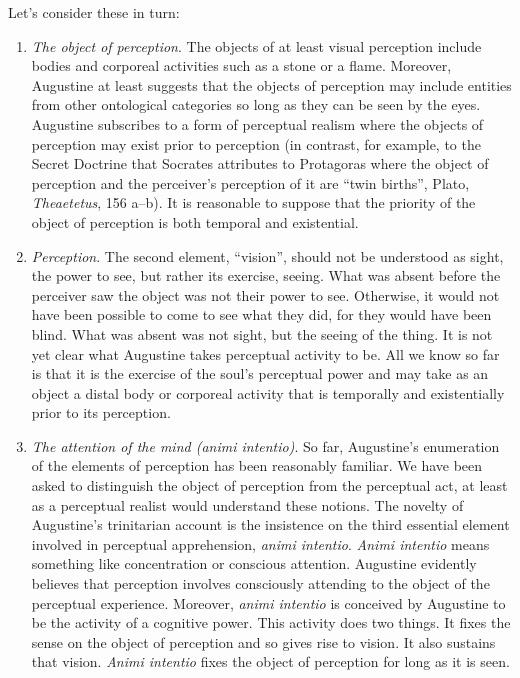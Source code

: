 \documentclass[12pt]{article}
\begin{document}
Let's consider these in turn:
\begin{enumerate}[(1)]
	\item \emph{The object of perception}. The objects of at least visual perception include bodies and corporeal activities such as a stone or a flame. Moreover, Augustine at least suggests that the objects of perception may include entities from other ontological categories so long as they can be seen by the eyes. Augustine subscribes to a form of perceptual realism where the objects of perception may exist prior to perception (in contrast, for example, to the Secret Doctrine that Socrates attributes to Protagoras where the object of perception and the perceiver's perception of it are ``twin births'', Plato, \emph{Theaetetus}, 156 a--b). It is reasonable to suppose that the priority of the object of perception is both temporal and existential.
	\item \emph{Perception}. The second element, ``vision'', should not be understood as sight, the power to see, but rather its exercise, seeing. What was absent before the perceiver saw the object was not their power to see. Otherwise, it would not have been possible to come to see what they did, for they would have been blind. What was absent was not sight, but the seeing of the thing. It is not yet clear what Augustine takes perceptual activity to be. All we know so far is that it is the exercise of the soul's perceptual power and may take as an object a distal body or corporeal activity that is temporally and existentially prior to its perception.
	\item \emph{The attention of the mind (\emph{animi intentio})}. So far, Augustine's enumeration of the elements of perception has been reasonably familiar. We have been asked to distinguish the object of perception from the perceptual act, at least as a perceptual realist would understand these notions. The novelty of Augustine's trinitarian account is the insistence on the third essential element involved in perceptual apprehension, \emph{animi intentio}. \emph{Animi intentio} means something like concentration or conscious attention. Augustine evidently believes that perception involves consciously attending to the object of the perceptual experience. Moreover, \emph{animi intentio} is conceived by Augustine to be the activity of a cognitive power. This activity does two things. It fixes the sense on the object of perception and so gives rise to vision. It also sustains that vision. \emph{Animi intentio} fixes the object of perception for long as it is seen.
\end{enumerate}
\end{document}
